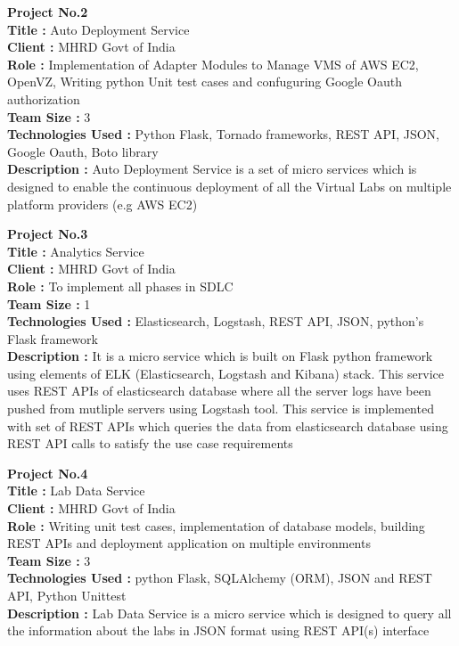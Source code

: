 \documentclass{resume} %
\begin{document}
\bigskip

\textbf {Project No.2} \\
\textbf{Title : } Auto Deployment Service \\
\textbf{Client : } MHRD Govt of India \\
\textbf{Role : } Implementation of Adapter Modules to Manage
VMS of AWS EC2, OpenVZ, Writing python Unit test cases and
confuguring Google Oauth authorization \\
\textbf{Team Size : } 3 \\
\textbf{Technologies Used :} Python Flask, Tornado
frameworks, REST API, JSON, Google Oauth, Boto library \\
\textbf{Description :} Auto Deployment Service is a set
of micro services which is designed to enable the continuous
deployment of all the Virtual Labs on multiple platform
providers (e.g AWS EC2)



\bigskip

\textbf {Project No.3} \\
\textbf{Title : } Analytics Service \\
\textbf{Client : } MHRD Govt of India \\
\textbf{Role : } To implement all phases in SDLC  \\
\textbf{Team Size : } 1 \\
\textbf{Technologies Used :} Elasticsearch, Logstash, REST API, JSON, python's Flask
framework \\
\textbf{Description :} It is a
micro service which is built on Flask python framework using
elements of ELK (Elasticsearch, Logstash and Kibana)
stack. This service uses REST APIs of elasticsearch database
where all the server logs have been pushed from mutliple
servers using Logstash tool. This service is implemented
with set of REST APIs which queries the data from
elasticsearch database using REST API calls to satisfy the
use case requirements


\bigskip

\textbf {Project No.4} \\
\textbf{Title : }  Lab Data Service \\
\textbf{Client : } MHRD Govt of India \\
\textbf{Role : } Writing unit test cases, implementation of
database models, building REST APIs and deployment
application on multiple environments \\
\textbf{Team Size : } 3 \\
\textbf{Technologies Used :} python Flask, SQLAlchemy (ORM), JSON and REST API, Python Unittest \\
\textbf{Description :} Lab Data
Service is a micro service which is designed to query all
the information about the labs in JSON format using REST
API(s) interface
\end{document}
